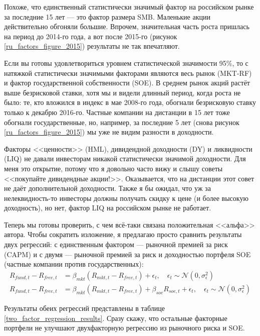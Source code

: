 Похоже, что единственный статистически значимый фактор на российском рынке за последние 15 лет --- это фактор размера SMB. Маленькие акции действительно обгоняли большие. Впрочем, значительная часть роста пришлась на период до 2014-го года, а вот после 2015-го (рисунок \ref{ru_factors_figure_2015}) результаты не так впечатляют.

Если вы готовы удовлетвориться уровнем статистической значимости 95\%, то с натяжкой статистически значимыми факторами являются весь рынок (MKT-RF) и фактор государственной собственности (SOE). В среднем рынок акций растёт выше безрисковой ставки, хотя мы и видели длинный период, когда роста не было: те, кто вложился в индекс в мае 2008-го года, обогнали безрисковую ставку только к декабрю 2016-го. Частные компании на дистанции в 15 лет тоже обогнали государственные, но, например, за последние 5 лет (снова рисунок \ref{ru_factors_figure_2015}) мы уже не видим разности в доходности.

Факторы <<ценности>> (HML), дивидендной доходности (DY) и ликвидности (LIQ) не давали инвесторам никакой статистически значимой доходности. Для меня это открытие, потому что я довольно часто вижу и слышу советы <<покупайте дивидендные акции!>>. Оказывается, что на дистанции этот совет не даёт дополнительной доходности. Также я бы ожидал, что уж за нелеквидность-то инвесторы должны получать скидку к цене (и более высокую доходность), но нет, фактор LIQ на российском рынке не работает.

Теперь мы готовы проверить, с чем всё-таки связана положительная <<альфа>> автора. Чтобы сократить изложение, я предлагаю просто сравнить результаты двух регрессий: с единственным фактором --- рыночной премией за риск (CAPM) и с двумя --- рыночной премией за риск и доходностью портфеля SOE (частные компании против государственных):
\begin{align*}
R_{fund,t} - R_{free,t} &= \beta_{mkt}(R_{mkt,t} - R_{free,t}) + \epsilon_t, \quad \epsilon_t \sim \mathcal{N}(0, \sigma_{\epsilon}^2) \\
R_{fund,t} - R_{free,t} &= \beta_{mkt}(R_{mkt,t} - R_{free,t}) + \beta_{soe}R_{soe,t} + \epsilon_t, \quad \epsilon_t \sim \mathcal{N}(0, \sigma_{\epsilon}^2)
\end{align*}

Результаты обеих регрессий представлены в таблице \ref{two_factor_regression_results}. Сразу скажу, что остальные факторные портфели не улучшают двухфакторную регрессию из рыночного риска и SOE.

